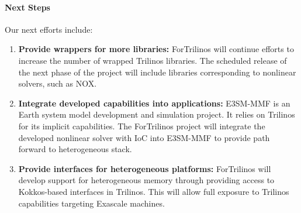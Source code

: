 \paragraph{Next Steps}

Our next efforts include:
\begin{enumerate}
  \item \textbf{Provide wrappers for more libraries:} ForTrilinos will continue
    efforts to increase the number of wrapped Trilinos libraries. The scheduled
    release of the next phase of the project will include libraries
    corresponding to nonlinear solvers, such as NOX.
  \item \textbf{Integrate developed capabilities into applications:} E3SM-MMF
    is an Earth system model development and simulation project. It relies on
    Trilinos for its implicit capabilities. The ForTrilinos project will
    integrate the developed nonlinear solver with IoC into E3SM-MMF to provide
    path forward to heterogeneous stack.
  \item \textbf{Provide interfaces for heterogeneous platforms:} ForTrilinos
    will develop support for heterogeneous memory through providing access to
    Kokkos-based interfaces in Trilinos. This will allow full exposure to
    Trilinos capabilities targeting Exascale machines.
\end{enumerate}
